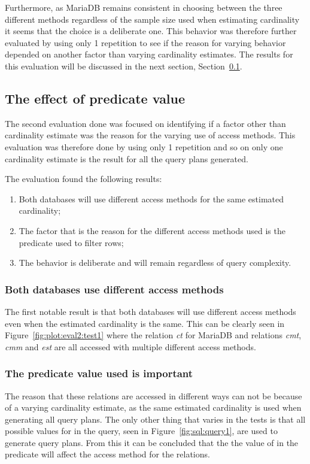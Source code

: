 Furthermore, as MariaDB remains consistent in choosing between the three
different methods regardless of the sample size used when estimating cardinality
it seems that the choice is a deliberate one. This behavior was therefore
further evaluated by using only 1 repetition to see if the reason for varying
behavior depended on another factor than varying cardinality estimates. The
results for this evaluation will be discussed in the next section,
Section~\ref{sec:predicatecorrelation}.

\subsection{The effect of predicate value}\label{sec:predicatecorrelation}
The second evaluation done was focused on identifying if a factor other than
cardinality estimate was the reason for the varying use of access methods. This
evaluation was therefore done by using only 1 repetition and so on only one
cardinality estimate is the result for all the query plans generated.

The evaluation found the following results:
\begin{enumerate}
\item Both databases will use different access methods for the same estimated
  cardinality;
\item The factor that is the reason for the different access methods used is the
  predicate used to filter rows;
\item The behavior is deliberate and will remain regardless of query complexity.
\end{enumerate}

\subsubsection{Both databases use different access methods}
The first notable result is that both databases will use different access
methods even when the estimated cardinality is the same. This can be clearly
seen in Figure~\ref{fig:plot:eval2:test1} where the relation \textit{ct} for
MariaDB and relations \textit{cmt}, \textit{cmm} and \textit{est} are all
accessed with multiple different access methods.

\subsubsection{The predicate value used is important}
The reason that these relations are accessed in different ways can not be
because of a varying cardinality estimate, as the same estimated cardinality is
used when generating all query plans. The only other thing that varies in the
tests is that all possible values for  in the query, seen in
Figure~\ref{fig:sql:query1}, are used to generate query plans. From this it can
be concluded that the the value of  in the predicate  will affect the access method for the relations.

